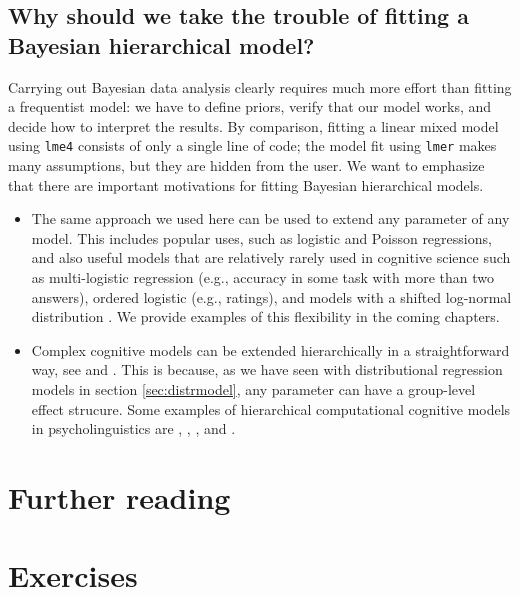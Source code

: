 \documentclass[12pt,]{krantz}
\theoremstyle{definition}
\theoremstyle{definition}
\theoremstyle{definition}
\theoremstyle{remark}
\begin{document}
\hypertarget{why-should-we-take-the-trouble-of-fitting-a-bayesian-hierarchical-model}{%
\subsection{Why should we take the trouble of fitting a Bayesian hierarchical model?}\label{why-should-we-take-the-trouble-of-fitting-a-bayesian-hierarchical-model}}

Carrying out Bayesian data analysis clearly requires much more effort than fitting a frequentist model: we have to define priors, verify that our model works, and decide how to interpret the results. By comparison, fitting a linear mixed model using \texttt{lme4} consists of only a single line of code; the model fit using \texttt{lmer} makes many assumptions, but they are hidden from the user. We want to emphasize that there are important motivations for fitting Bayesian hierarchical models.

\begin{itemize}
\item
  The same approach we used here can be used to extend any parameter of any
  model. This includes popular uses, such as logistic and Poisson regressions, and also useful models that are relatively rarely used in cognitive science such as multi-logistic regression (e.g., accuracy in some task with more than two answers), ordered logistic (e.g., ratings), and models with a shifted log-normal distribution \citep[see][]{NicenboimEtAl2016Frontiersb, Rouder2005}. We provide examples of this flexibility in the coming chapters.
\item
  Complex cognitive models can be extended hierarchically in a straightforward way, see \citet{Lee2011} and \citet{LeeWagenmakers2014}. This is because, as we have seen with distributional regression models in section \ref{sec:distrmodel}, any parameter can have a group-level effect strucure. Some examples of hierarchical computational cognitive models in psycholinguistics are \citet{LogacevVasishth2015}, \citet{nicenboimModelsRetrievalSentence2018}, \citet{VasishthEtAl2017Modelling}, and \citet{VasishthEtAl2017Feature}.
\end{itemize}

\hypertarget{further-reading-4}{%
\section{Further reading}\label{further-reading-4}}

\hypertarget{exercises-3}{%
\section{Exercises}\label{exercises-3}}
\end{document}
